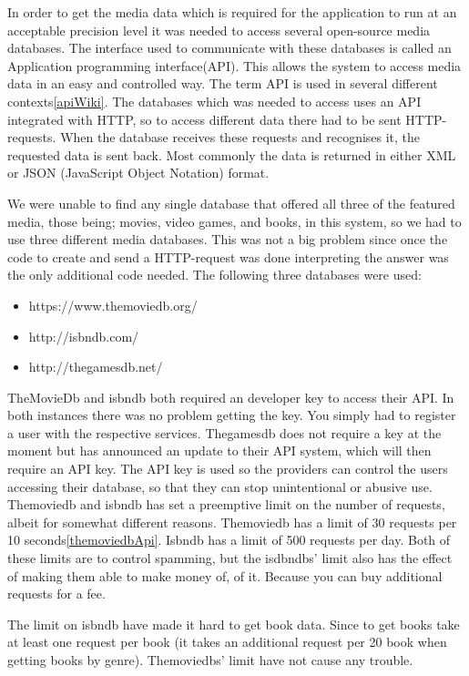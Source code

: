 In order to get the media data which is required for the application to run at an acceptable precision level it was needed to access several open-source media databases. The interface used to communicate with these databases is called an Application programming interface(API). This allows the system to access media data in an easy and controlled way. The term API is used in several different contexts\ref{apiWiki}. The databases which was  needed to access uses an API integrated with HTTP, so to access different data there had to be sent HTTP-requests. When the database receives these requests and recognises it, the requested data is sent back. Most commonly the data is returned in either XML or JSON (JavaScript Object Notation) format.

We were unable to find any single database that offered all three of the featured media, those being; movies, video games, and books, in this system, so we had to use three different media databases. This was not a big problem since once the code to create and send a HTTP-request was done interpreting the answer was the only additional code needed.  The following three databases were used:

\begin{itemize}
	\item https://www.themoviedb.org/
	\item http://isbndb.com/
	\item http://thegamesdb.net/
\end{itemize}

TheMovieDb and isbndb both required an developer key to access their API. In both instances there was no problem getting the key. You simply had to register a user with the respective services. %
Thegamesdb does not require a key at the moment but has announced an update to their API system, which will then require an API key.
The API key is used so the providers can control the users accessing their database, so that  they can stop unintentional or abusive use. Themoviedb and isbndb has set a preemptive limit on the number of requests, albeit for somewhat different reasons. Themoviedb has a limit of 30 requests per 10 seconds\ref{themoviedbApi}. Isbndb has a limit of 500 requests per day. Both of these limits are to control spamming, but the isdbndbs’ limit also has the effect of making them able to make money of, of it. Because you can buy additional requests for a fee.

The limit on isbndb have made it hard to get book data. Since to get books take at least one request per book (it takes an additional request per 20 book when getting books by genre). Themoviedbs’ limit have not cause any trouble.

